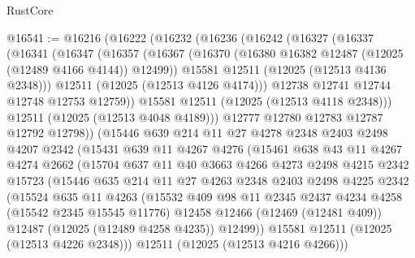 \begin{lexlean}{RustCore}
\begin{coremodule}
@16541 := @16216
    (@16222
      (@16232
        (@16236
          (@16242
            (@16327
              (@16337
                (@16341
                  (@16347
                    (@16357
                      (@16367
                        (@16370 (@16380 @16382 @12487 (@12025 (@12489 @4166 @4144)) @12499))
                        @15581
                        @12511
                        (@12025 (@12513 @4136 @2348)))
                      @12511
                      (@12025 (@12513 @4126 @4174)))
                    @12738
                    @12741
                    @12744
                    @12748
                    @12753
                    @12759))
                @15581
                @12511
                (@12025 (@12513 @4118 @2348)))
              @12511
              (@12025 (@12513 @4048 @4189)))
            @12777
            @12780
            @12783
            @12787
            @12792
            @12798))
        (@15446
          @639
          @214
          @11
          @27
          @4278
          @2348
          @2403
          @2498
          @4207
          @2342
          (@15431
            @639
            @11
            @4267
            @4276
            (@15461
              @638
              @43
              @11
              @4267
              @4274
              @2662
              (@15704
                @637
                @11
                @40
                @3663
                @4266
                @4273
                @2498
                @4215
                @2342
                @15723
                (@15446
                  @635
                  @214
                  @11
                  @27
                  @4263
                  @2348
                  @2403
                  @2498
                  @4225
                  @2342
                  (@15524
                    @635
                    @11
                    @4263
                    (@15532
                      @409
                      @98
                      @11
                      @2345
                      @2437
                      @4234
                      @4258
                      (@15542 @2345 @15545 @11776)
                      @12458
                      @12466
                      (@12469 (@12481 @409))
                      @12487
                      (@12025 (@12489 @4258 @4235))
                      @12499))
                  @15581
                  @12511
                  (@12025 (@12513 @4226 @2348)))
                @12511
                (@12025 (@12513 @4216 @4266)))

\end{coremodule}
\end{lexlean}
